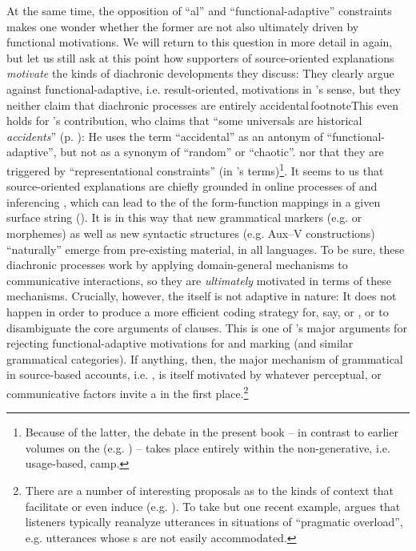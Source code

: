 \documentclass[output=paper]{langsci/langscibook}
\begin{document}
At the same time, the opposition of “al” and “functional-adaptive” constraints makes one wonder whether the former are not also ultimately driven by functional motivations. We will return to this question in more detail in  again, but let us still ask at this point how supporters of source-oriented explanations \textit{motivate} the kinds of diachronic developments they discuss: They clearly argue against functional-adaptive, i.e. result-oriented, motivations in ’s sense, but they neither claim that diachronic processes are entirely accidental\largerpage\,footnote{This even holds for ’s contribution, who claims that “some universals are historical \textit{accidents}” (p. \pageref{p:collins:historicalaccidents}): He uses the term “accidental” as an antonym of “functional-adaptive”, but not as a synonym of “random” or “chaotic”.} nor that they are triggered by  “representational constraints” (in ’s terms)\footnote{Because of the latter, the debate in the present book – in contrast to earlier volumes on the  (e.g. \citealt{Hawkins1988_ExplEd,Good2008_Change}) – takes place entirely within the non-generative, i.e. usage-based, camp.}. It seems to us that source-oriented explanations are chiefly grounded in online processes of  and inferencing \citep{Bybee2010}, which can lead to the  of the form-function mappings in a given surface string (\citealt{Croft2000,DeSmet2009}). It is in this way that new grammatical markers (e.g.  or  morphemes) as well as new syntactic structures (e.g. Aux–V constructions) “naturally” emerge from pre-existing material, in all languages. To be sure, these diachronic processes work by applying domain-general  mechanisms to communicative interactions, so they are \textit{ultimately} motivated in terms of these mechanisms. Crucially, however, the  itself is not adaptive in nature: It does not happen in order to produce a more efficient coding strategy for, say,  or , or to disambiguate the core arguments of  clauses. This is one of ’s major arguments for rejecting functional-adaptive motivations for  and  marking (and similar grammatical categories). If anything, then, the major mechanism of grammatical  in source-based accounts, i.e. , is itself motivated by whatever perceptual,  or communicative factors invite a  in the first place.\footnote{There 
\label{fn:epilog:8}
are a number of interesting proposals as to the kinds of context that facilitate or even induce  (e.g. \citealt{DetgesWaltereit2002,HansenWaltereit2006,RosemeyerGrossman2017,SchwenterWaltereit2009,TraugottDasher2002}). To take but one recent example, \citet{Eckardt2009} argues that listeners typically reanalyze utterances in situations of “pragmatic overload”, e.g. utterances whose s are not easily accommodated.}
\end{document}
